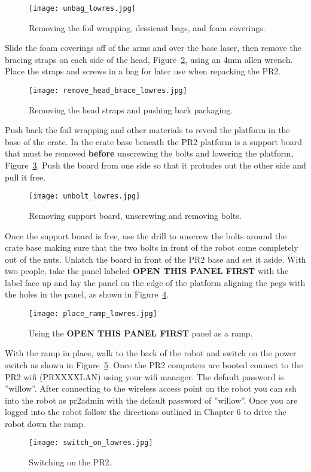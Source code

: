 \begin{figure}[h]
\centering
\texttt{[image: unbag\_lowres.jpg]}
\caption{Removing the foil wrapping, dessicant bags, and foam coverings.}
\label{fig:unbagPR2}
\end{figure}

Slide the foam coverings off of the arms and over the base laser, then remove
the bracing straps on each side of the head, Figure~\ref{fig:head_straps}, using
an 4mm allen wrench. Place the straps and screws in a bag for later use when
repacking the PR2.

\begin{figure}[h]
\centering
\texttt{[image: remove\_head\_brace\_lowres.jpg]}
\caption{Removing the head straps and pushing back packaging.}
\label{fig:head_straps}
\end{figure}

Push back the foil wrapping and other materials to reveal the platform in the
base of the crate. In the crate base beneath the PR2 platform is a support board
that must be removed {\bf before} unscrewing the bolts and lowering the platform, 
Figure~\ref{fig:unbolt}. Push the board from one side so that it protudes out the 
other side and pull it free. 

\begin{figure}[h]
\centering
\texttt{[image: unbolt\_lowres.jpg]}
\caption{Removing support board, unscrewing and removing bolts.}
\label{fig:unbolt}
\end{figure}

Once the support board is free, use the drill to unscrew the bolts around
the crate base making sure that the two bolts in front of the robot come
completely out of the nuts. Unlatch the board in front of the PR2 base and set
it aside. With two people, take the panel labeled {\bf OPEN THIS PANEL FIRST} with
the label face up and lay the panel on the edge of the platform aligning the pegs
with the holes in the panel, as shown in Figure~\ref{fig:place_ramp}.

\begin{figure}[h]
\centering
\texttt{[image: place\_ramp\_lowres.jpg]}
\caption{Using the {\bf OPEN THIS PANEL FIRST} panel as a ramp.}
\label{fig:place_ramp}
\end{figure}

With the ramp in place, walk to the back of the robot and switch on the power switch
as shown in Figure~\ref{fig:switch_on}. Once the PR2 computers are booted connect 
to the PR2 wifi (PRXXXXLAN) using your wifi manager. The default password is ''willow''. 
After connecting to the wireless access point on the robot you can ssh into the robot 
as pr2admin with the default password of ''willow''. Once you are logged into the robot 
follow the directions outlined in Chapter 6 to drive the robot down the ramp. 

\begin{figure}[h]
\centering
\texttt{[image: switch\_on\_lowres.jpg]}
\caption{Switching on the PR2.}
\label{fig:switch_on}
\end{figure}

